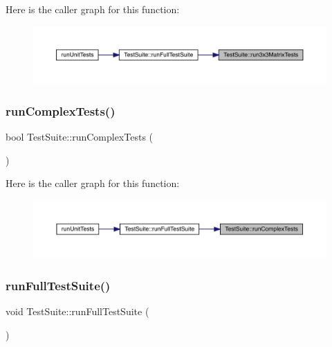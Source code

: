 Here is the caller graph for this function\+:
\nopagebreak
\begin{figure}[H]
\begin{center}
\leavevmode
\includegraphics[width=350pt]{class_test_suite_a91444c36a86d453cc9922d888b248a6b_icgraph}
\end{center}
\end{figure}
\mbox{\label{class_test_suite_a0597dcd7c68390ac33d8095f2a76ae0f}} 
\subsubsection{\texorpdfstring{runComplexTests()}{runComplexTests()}}
{\footnotesize\ttfamily bool Test\+Suite\+::run\+Complex\+Tests (\begin{DoxyParamCaption}{ }\end{DoxyParamCaption})}

Here is the caller graph for this function\+:
\nopagebreak
\begin{figure}[H]
\begin{center}
\leavevmode
\includegraphics[width=350pt]{class_test_suite_a0597dcd7c68390ac33d8095f2a76ae0f_icgraph}
\end{center}
\end{figure}
\mbox{\label{class_test_suite_a0fa7e788a1b1c235faa475c0d1aaa1e3}} 
\subsubsection{\texorpdfstring{runFullTestSuite()}{runFullTestSuite()}}
{\footnotesize\ttfamily void Test\+Suite\+::run\+Full\+Test\+Suite (\begin{DoxyParamCaption}{ }\end{DoxyParamCaption})}

